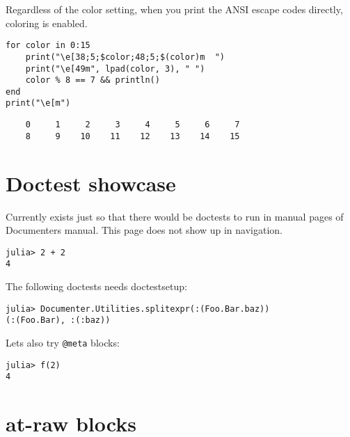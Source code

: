 \label{13267379516757075300}{}


Regardless of the color setting, when you print the ANSI escape codes directly, coloring is enabled.




\begin{verbatim}
for color in 0:15
    print("\e[38;5;$color;48;5;$(color)m  ")
    print("\e[49m", lpad(color, 3), " ")
    color % 8 == 7 && println()
end
print("\e[m")
\end{verbatim}


\begin{lstlisting}
    0     1     2     3     4     5     6     7
    8     9    10    11    12    13    14    15

\end{lstlisting}



\section{Doctest showcase}



\label{2602340166667619136}{}


Currently exists just so that there would be doctests to run in manual pages of Documenter{\textquotesingle}s manual. This page does not show up in navigation.




\begin{verbatim}
julia> 2 + 2
4
\end{verbatim}



The following doctests needs doctestsetup:




\begin{verbatim}
julia> Documenter.Utilities.splitexpr(:(Foo.Bar.baz))
(:(Foo.Bar), :(:baz))
\end{verbatim}



Let{\textquotesingle}s also try \texttt{@meta} blocks:






\begin{verbatim}
julia> f(2)
4
\end{verbatim}





\section{at-raw blocks}



